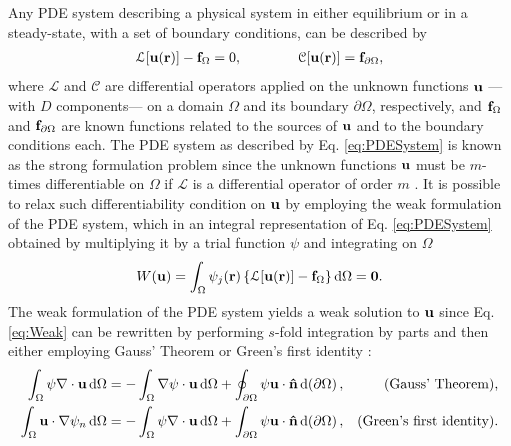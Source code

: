 
Any PDE system describing a physical system in either equilibrium or in a steady-state, with a set of boundary conditions, can be described by \cite{dhatt_finite_2012}
%
\begin{align}
    \mathcal{L}[\vb{u}(\vb{r})] - \vb{f}_\Omega = 0,
    \qquad\qquad
    \mathcal{C}[\vb{u}(\vb{r})] = \vb{f}_{\partial\Omega},
\label{eq:PDESystem}
\end{align}
%
where $\mathcal{L}$ and $\mathcal{C}$ are differential operators applied on the unknown functions $\vb{u}$ ---with $D$ components--- on a domain $\Omega$ and its boundary $\partial\Omega$, respectively, and  $\vb{f}_\Omega$ and $\vb{f}_{\partial\Omega}$ are known functions related to the sources of $\vb{u}$ and to the boundary conditions each.  The PDE system as described by Eq. \eqref{eq:PDESystem} is known as the strong formulation problem since  the unknown functions $\vb{u}$ must be $m$-times differentiable on $\Omega$ if $\mathcal{L}$ is a differential operator of order $m$ \cite{dhatt_finite_2012,larson_finite_2013}. It is possible to relax such differentiability condition on $\vb{u}$ by employing the weak formulation of the PDE system, which in an integral representation of Eq. \eqref{eq:PDESystem} obtained by multiplying it by a trial function $\psi$ and integrating on $\Omega$ \cite{dhatt_finite_2012,larson_finite_2013,fletcher_computational_1984}
%
\begin{align}
    W(\vb{u}) = \int_\Omega \psi_j(\vb{r}) \left\{ \mathcal{L}[\vb{u}(\vb{r})] - \vb{f}_\Omega   \right\} \dd{\Omega} = \vb{0}.
    \label{eq:Weak}
\end{align}
%
The weak formulation of the PDE system yields a weak solution to $\vb{u}$ since Eq. \eqref{eq:Weak} can be rewritten by performing $s$-fold integration by parts and then either employing Gauss' Theorem or Green's first identity \cite{larson_finite_2013}:
%
\begin{align}
    \int_\Omega \psi \nabla\cdot \vb{u}\dd{\Omega} &=  - \int_\Omega \nabla\psi \cdot \vb{u} \dd{\Omega} + \oint_{\partial\Omega} \psi \vb{u}\cdot \vu{n}\dd{(\partial\Omega)},
        & \mbox{(Gauss' Theorem),}
        \label{eq:GT}
    \\
    \int_\Omega \vb{u}\cdot\nabla\psi_n \dd{\Omega} &=  - \int_\Omega \psi \nabla\cdot\vb{u}\dd{\Omega}  + \int_{\partial \Omega}\psi \vb{u}\cdot\vu{n}\dd{(\partial\Omega)},
        & \mbox{(Green's first identity).}
        \label{eq:G1I}
\end{align}
